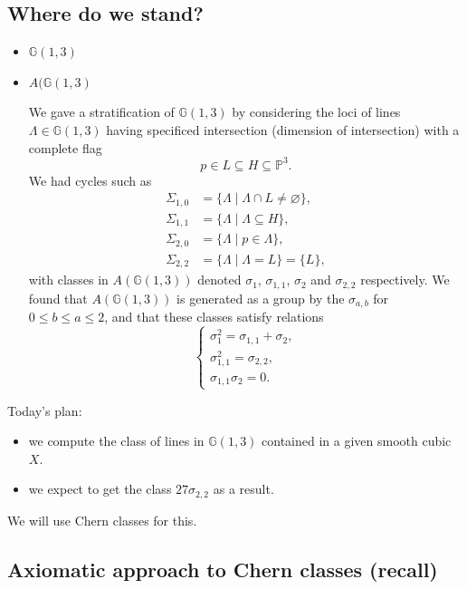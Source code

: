 \documentclass[12pt,a4paper]{amsart}
\theoremstyle{plain}
\theoremstyle{definition}
\theoremstyle{remark}
\begin{document}
\subsection{Where do we stand?}

\begin{itemize}
  \item \underline{} $\mathbb{G}(1,3)$ \checkmark
  \item \underline{} $A(\mathbb{G}(1,3)$ \checkmark

    We gave a stratification of $\mathbb{G}(1,3)$ by considering the loci of lines $\Lambda \in \mathbb{G}(1,3)$ having specificed intersection (dimension of intersection) with a complete flag
    \[ p \in L \subseteq H \subseteq \mathbb{P}^{3}. \]
    We had cycles such as
    \begin{align*}
      \Sigma_{1,0} & = \{ \Lambda \mid \Lambda \cap L \neq \varnothing \}, \\
      \Sigma_{1,1} & = \{ \Lambda \mid \Lambda \subseteq H \}, \\
      \Sigma_{2,0} & = \{ \Lambda \mid p \in \Lambda \}, \\
      \Sigma_{2,2} & = \{ \Lambda \mid \Lambda = L \} = \{L\},
    \end{align*}
    with classes in $A(\mathbb{G}(1,3))$ denoted $\sigma_{1}$, $\sigma_{1,1}$, $\sigma_{2}$ and $\sigma_{2,2}$ respectively.
    We found that $A(\mathbb{G}(1,3))$ is generated as a group by the $\sigma_{a,b}$ for $0 \leq b \leq a \leq 2$, and that these classes satisfy relations
    \[ \begin{cases}
      \sigma_{1}^{2} = \sigma_{1,1} + \sigma_{2}, \\
      \sigma_{1,1}^{2} = \sigma_{2,2}, \\
      \sigma_{1,1}\sigma_{2} = 0.
    \end{cases} \]
\end{itemize}

Today's plan:
\begin{itemize}
  \item \underline{} we compute the class of lines in $\mathbb{G}(1,3)$ contained in a given smooth cubic $X$.
  \item \underline{} we expect to get the class $27\sigma_{2,2}$ as a result.
\end{itemize}

We will use Chern classes for this.

\subsection{Axiomatic approach to Chern classes (recall)}
\end{document}
